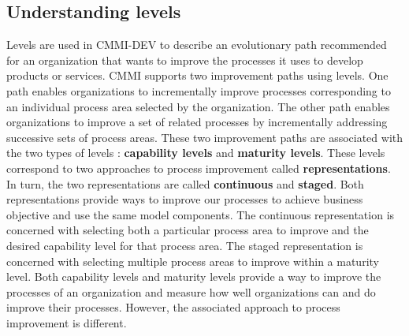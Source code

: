 \subsection{Understanding levels}
Levels are used in CMMI-DEV to describe an evolutionary path recommended for an organization that wants to improve the processes it uses to develop products or services. CMMI supports two improvement paths using levels. One path enables organizations to incrementally improve processes corresponding to an individual process area selected by the organization. The other path enables organizations to improve a set of related processes by incrementally addressing successive sets of process areas. These two improvement paths are associated with the two types of levels : \textbf{capability levels} and \textbf{maturity levels}. These levels correspond to two approaches to process improvement called \textbf{representations}. In turn, the two representations are called \textbf{continuous} and \textbf{staged}. Both representations provide ways to improve our processes to achieve business objective and use the same model components. The continuous representation is concerned with selecting both a particular process area to improve and the desired capability level for that process area. The staged representation is concerned with selecting multiple process areas to improve within a maturity level. Both capability levels and maturity levels provide a way to improve the processes of an organization and measure how well organizations can and do improve their processes. However, the associated approach to process improvement is different.
